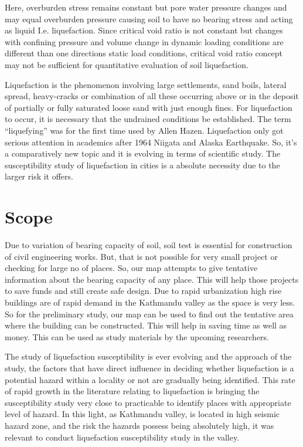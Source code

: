 Here, overburden stress remains constant but pore water pressure changes and may equal overburden pressure causing soil to have no bearing stress and acting as liquid I.e. liquefaction. Since critical void ratio is not constant but changes with confining pressure and volume change in dynamic loading conditions are different than one  directions static load conditions, critical void ratio concept may not be sufficient for quantitative evaluation of soil liquefaction.

Liquefaction is the phenomenon involving large settlements, sand boils, lateral spread, heavy-cracks or combination of all these occurring above or in the deposit of partially or fully saturated loose sand with just enough fines. For liquefaction to occur, it is necessary that the undrained conditions be established. The term “liquefying” was for the first time used by Allen Hazen\cite{hazen_study_1918}. Liquefaction only got serious attention in academics after 1964 Niigata and Alaska Earthquake. So, it’s a comparatively new topic and it is evolving in terms of scientific study. The susceptibility study of liquefaction in cities is a absolute necessity due to the larger risk it offers.
 
 \section{Scope}
Due to variation of bearing capacity of soil, soil test is essential for construction of civil engineering works. But, that is not possible for very small project or checking for large no of places. So, our map attempts to give tentative information about the bearing capacity of any place. This will help those projects to save funds and still create safe design. Due to rapid urbanization high rise buildings are of rapid demand in the Kathmandu valley as the space is very less. So for the preliminary study, our map can be used to find out the tentative area where the building can be constructed. This will help in saving time as well as money. This can be used as study materials by the upcoming researchers. 
 
The study of liquefaction susceptibility is ever evolving and the approach of the study, the factors that have direct influence in deciding whether liquefaction is a potential hazard within a locality or not are gradually being identified. This rate of rapid growth in the literature relating to liquefaction is bringing the susceptibility study very close to  practicable to identify places with appropriate level of hazard. In this light, as Kathmandu valley, is located in high seismic hazard zone, and the risk the hazards possess being absolutely high, it was relevant to conduct liquefaction susceptibility study in the valley. 
 
